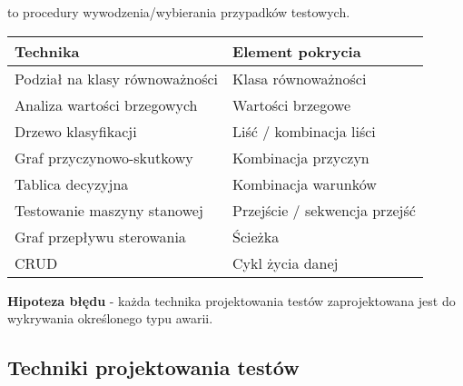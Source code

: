 \documentclass[../main.tex]{subfiles}
\begin{document}
    to procedury wywodzenia/wybierania przypadków testowych.

    \begin{tabular}{|p{8cm}||p{8cm}|}
        \hline
        \textbf{Technika} & \textbf{Element pokrycia}\\
        \hline
        \hline
        Podział na klasy równoważności & Klasa równoważności\\
        \hline
        Analiza wartości brzegowych & Wartości brzegowe\\
        \hline
        Drzewo klasyfikacji & Liść / kombinacja liści\\
        \hline
        Graf przyczynowo-skutkowy & Kombinacja przyczyn\\
        \hline
        Tablica decyzyjna & Kombinacja warunków\\
        \hline
        Testowanie maszyny stanowej & Przejście / sekwencja przejść\\
        \hline
        Graf przepływu sterowania & Ścieżka\\
        \hline
        CRUD & Cykl życia danej\\
        \hline
    \end{tabular}

    \textbf{Hipoteza błędu} - każda technika projektowania testów zaprojektowana jest do
    wykrywania określonego typu awarii.

    \subsection{Techniki projektowania testów}
\end{document}
